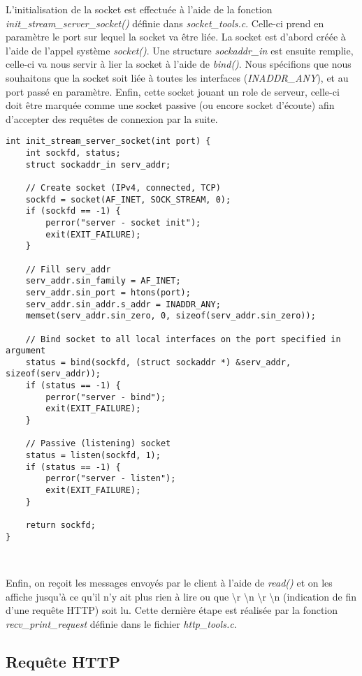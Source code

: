L'initialisation de la socket est effectuée à l'aide de la fonction \emph{init\_stream\_server\_socket()} définie dans \emph{socket\_tools.c}. Celle-ci prend en paramètre le port sur lequel la socket va être liée. La socket est d'abord créée à l'aide de l'appel système \emph{socket()}. Une structure \emph{sockaddr\_in} est ensuite remplie, celle-ci va nous servir à lier la socket à l'aide de \emph{bind()}. Nous spécifions que nous souhaitons que la socket soit liée à toutes les interfaces (\emph{INADDR\_ANY}), et au port passé en paramètre. Enfin, cette socket jouant un role de serveur, celle-ci doit être marquée comme une socket passive (ou encore socket d'écoute) afin d'accepter des requêtes de connexion par la suite.\\

\begin{lstlisting}
int init_stream_server_socket(int port) {
    int sockfd, status;
    struct sockaddr_in serv_addr;

    // Create socket (IPv4, connected, TCP)
    sockfd = socket(AF_INET, SOCK_STREAM, 0);
    if (sockfd == -1) {
        perror("server - socket init");
        exit(EXIT_FAILURE);
    }

    // Fill serv_addr
    serv_addr.sin_family = AF_INET;
    serv_addr.sin_port = htons(port);
    serv_addr.sin_addr.s_addr = INADDR_ANY;
    memset(serv_addr.sin_zero, 0, sizeof(serv_addr.sin_zero));

    // Bind socket to all local interfaces on the port specified in argument
    status = bind(sockfd, (struct sockaddr *) &serv_addr, sizeof(serv_addr));
    if (status == -1) {
        perror("server - bind");
        exit(EXIT_FAILURE);
    }

    // Passive (listening) socket
    status = listen(sockfd, 1);
    if (status == -1) {
        perror("server - listen");
        exit(EXIT_FAILURE);
    }

    return sockfd;
}
\end{lstlisting}
\

Enfin, on reçoit les messages envoyés par le client à l'aide de \emph{read()} et on les affiche jusqu'à ce qu'il n'y ait plus rien à lire ou que {\textbackslash r \textbackslash n \textbackslash r \textbackslash n} (indication de fin d'une requête HTTP) soit lu. Cette dernière étape est réalisée par la fonction \emph{recv\_print\_request} définie dans le fichier \emph{http\_tools.c}.

\subsection{Requête HTTP}
